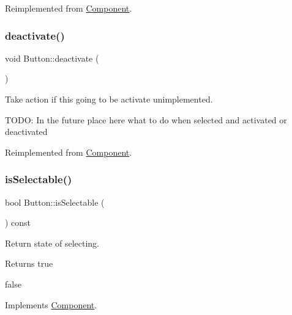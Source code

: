 Reimplemented from \hyperlink{classComponent_aaab29ea159109b4d0f63e9c519be6139}{Component}.

\mbox{\label{classButton_a57efb09b51a4846a25e7f61abee78cd6}} 
\subsubsection{\texorpdfstring{deactivate()}{deactivate()}}
{\footnotesize\ttfamily void Button\+::deactivate (\begin{DoxyParamCaption}{ }\end{DoxyParamCaption})\hspace{0.3cm}{\ttfamily [virtual]}}



Take action if this going to be activate unimplemented. 

T\+O\+DO\+: In the future place here what to do when selected and activated or deactivated

Reimplemented from \hyperlink{classComponent_aa4d1e5e0656ed03f7ff469db25f65053}{Component}.

\mbox{\label{classButton_a6f51f01b72f9c3319e96263dc59a677f}} 
\subsubsection{\texorpdfstring{is\+Selectable()}{isSelectable()}}
{\footnotesize\ttfamily bool Button\+::is\+Selectable (\begin{DoxyParamCaption}{ }\end{DoxyParamCaption}) const\hspace{0.3cm}{\ttfamily [virtual]}}



Return state of selecting. 

\begin{DoxyReturn}{Returns}
true 

false 
\end{DoxyReturn}


Implements \hyperlink{classComponent_aede74a18a443413465216f383a046028}{Component}.

\mbox{\label{classButton_a694455fc4d23bf1dd91836f9692933ad}} 
